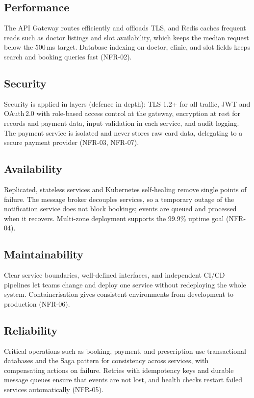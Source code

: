 \documentclass[12pt,a4paper]{article}
\begin{document}
\subsection{Performance}
The API Gateway routes efficiently and offloads TLS, and Redis caches frequent reads such as
doctor listings and slot availability, which keeps the median request below the 500\,ms target.
Database indexing on doctor, clinic, and slot fields keeps search and booking queries fast
(NFR-02).

\subsection{Security}
Security is applied in layers (defence in depth): TLS 1.2+ for all traffic, JWT and OAuth\,2.0
with role-based access control at the gateway, encryption at rest for records and payment data,
input validation in each service, and audit logging. The payment service is isolated and never
stores raw card data, delegating to a secure payment provider (NFR-03, NFR-07).

\subsection{Availability}
Replicated, stateless services and Kubernetes self-healing remove single points of failure.
The message broker decouples services, so a temporary outage of the notification service does
not block bookings; events are queued and processed when it recovers. Multi-zone deployment
supports the 99.9\% uptime goal (NFR-04).

\subsection{Maintainability}
Clear service boundaries, well-defined interfaces, and independent CI/CD pipelines let teams
change and deploy one service without redeploying the whole system. Containerisation gives
consistent environments from development to production (NFR-06).

\subsection{Reliability}
Critical operations such as booking, payment, and prescription use transactional databases and
the Saga pattern for consistency across services, with compensating actions on failure. Retries
with idempotency keys and durable message queues ensure that events are not lost, and health
checks restart failed services automatically (NFR-05).
\end{document}
